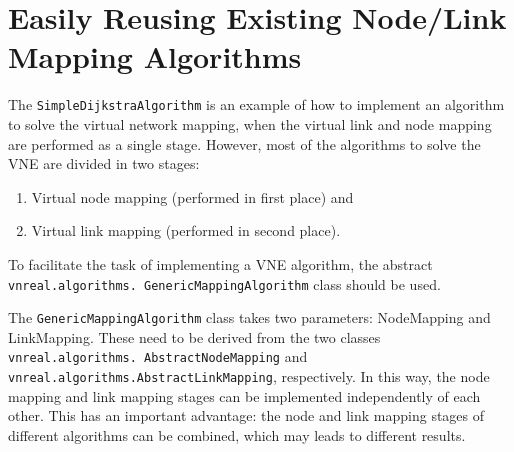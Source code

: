 \section{Easily Reusing Existing Node/Link Mapping Algorithms}
The \texttt{SimpleDijkstraAlgorithm} is an example of how to implement an algorithm to solve the virtual network mapping, 
when the virtual link and node mapping are performed as a single stage. 
However, most of the algorithms to solve the VNE are divided in two stages:
\begin{enumerate}
	\item Virtual node mapping (performed in first place) and
	\item Virtual link mapping (performed in second place).
\end{enumerate}
To facilitate the task of implementing a VNE algorithm, the abstract \texttt{vnreal.algorithms. GenericMappingAlgorithm} class should be used.

The \texttt{GenericMappingAlgorithm} class takes two parameters: NodeMapping and LinkMapping. 
These need to be derived from the two classes \texttt{vnreal.\-algorithms.\ AbstractNodeMapping} and \texttt{vnreal.algorithms.AbstractLinkMapping}, respectively. 
In this way, the node mapping and link mapping stages can be implemented independently of each other. 
This has an important advantage: the node and link mapping stages of different algorithms can be combined, 
which may leads to different results.

